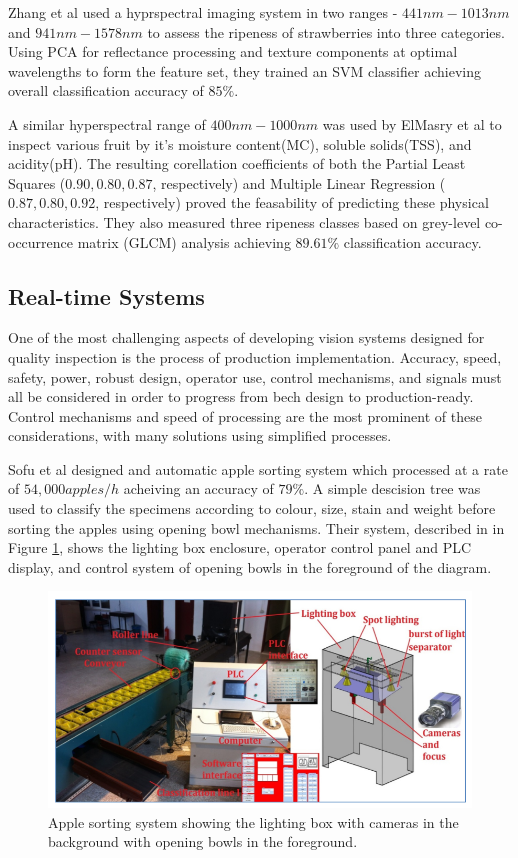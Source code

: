 \documentclass[fleqn,twoside]{article}
\begin{document}
Zhang et al \cite{zhang} used a hyprspectral imaging system in two ranges - $441nm-1013nm$ and $941nm-1578nm$ to assess the ripeness of strawberries into three categories. Using PCA for reflectance processing and texture components at optimal wavelengths to form the feature set, they trained an SVM classifier achieving overall classification accuracy of $85\%$. 

A similar hyperspectral range of $400nm-1000nm$ was used by ElMasry et al \cite{elmasry2} to inspect various fruit by it's moisture content(MC), soluble solids(TSS), and acidity(pH). The resulting corellation coefficients of both the Partial Least Squares ($0.90, 0.80, 0.87$, respectively) and Multiple Linear Regression ($0.87, 0.80, 0.92$, respectively) proved the feasability of predicting these physical characteristics. They also measured three ripeness classes based on grey-level co-occurrence matrix (GLCM) analysis achieving $89.61\%$ classification accuracy. 




\subsection{Real-time Systems}

One of the most challenging aspects of developing vision systems designed for quality inspection is the process of production implementation. Accuracy, speed, safety, power, robust design, operator use, control mechanisms, and signals must all be considered in order to progress from bech design to production-ready. Control mechanisms and speed of processing are the most prominent of these considerations, with many solutions using simplified processes.

Sofu et al \cite{sofu} designed and automatic apple sorting system which processed at a rate of $54,000 apples/h$ acheiving an accuracy of $79\%$. A simple descision tree was used to classify the specimens according to colour, size, stain and weight before sorting the apples using opening bowl mechanisms. Their system, described in in Figure \ref{fig:apple_system}, shows the lighting box enclosure, operator control panel and PLC display, and control system of opening bowls in the foreground of the diagram.

\begin{figure}[h]
	\centering
	\includegraphics[width=0.7\linewidth]{apple_system.png}
	\caption{Apple sorting system \cite{sofu} showing the lighting box with cameras in the background with opening bowls in the foreground.}
	\label{fig:apple_system}
\end{figure}%
\end{document}
